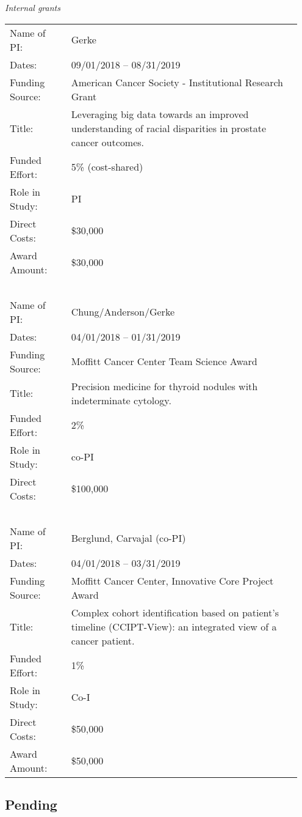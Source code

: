 \documentclass[11pt, a4paper]{article} %
\begin{document}
\emph{Internal grants}
\begin{longtable}{@{}p{0.2\linewidth} p{0.75\linewidth}}
Name of PI: & Gerke \\
Dates: & 09/01/2018 -- 08/31/2019\\
Funding Source: & American Cancer Society - Institutional Research Grant\\
Title: & Leveraging big data towards an improved understanding of racial disparities in prostate cancer outcomes.\\
Funded Effort: & 5\% (cost-shared)\\
Role in Study: & PI \\
Direct Costs: & \$30,000\\
Award Amount: & \$30,000\\
~\\
Name of PI: & Chung/Anderson/Gerke\\
Dates: & 04/01/2018 -- 01/31/2019\\
Funding Source: & Moffitt Cancer Center Team Science Award\\
Title: & Precision medicine for thyroid nodules with indeterminate cytology.\\
Funded Effort: & 2\%\\
Role in Study: & co-PI\\
Direct Costs: & \$100,000\\
~\\
Name of PI: & Berglund, Carvajal (co-PI) \\
Dates: & 04/01/2018 -- 03/31/2019\\
Funding Source: & Moffitt Cancer Center, Innovative Core Project Award\\
Title: & Complex cohort identification based on patient's timeline (CCIPT-View): an integrated view of a cancer patient.\\
Funded Effort: & 1\%\\
Role in Study: & Co-I \\
Direct Costs: & \$50,000\\
Award Amount: & \$50,000\\
\end{longtable}

\subsection*{Pending}

\end{document}
